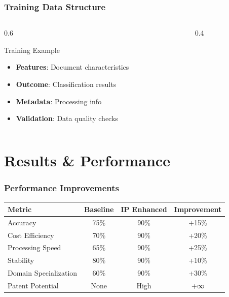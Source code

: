 \documentclass{beamer}
\begin{document}
\begin{frame}
\frametitle{Training Data Structure}
\begin{columns}
\begin{column}{0.6\textwidth}
\begin{block}{Training Example}
\begin{itemize}
\item \textbf{Features}: Document characteristics
\item \textbf{Outcome}: Classification results
\item \textbf{Metadata}: Processing info
\item \textbf{Validation}: Data quality checks
\end{itemize}
\end{block}
\end{column}
\begin{column}{0.4\textwidth}
\begin{center}
\end{center}
\end{column}
\end{columns}
\end{frame}

\section{Results \& Performance}

\begin{frame}
\frametitle{Performance Improvements}
\begin{table}[h]
\centering
\begin{tabular}{@{}lccc@{}}
\toprule
\textbf{Metric} & \textbf{Baseline} & \textbf{IP Enhanced} & \textbf{Improvement} \\
\midrule
Accuracy & 75\% & 90\% & +15\% \\
Cost Efficiency & 70\% & 90\% & +20\% \\
Processing Speed & 65\% & 90\% & +25\% \\
Stability & 80\% & 90\% & +10\% \\
Domain Specialization & 60\% & 90\% & +30\% \\
Patent Potential & None & High & +∞ \\
\bottomrule
\end{tabular}
\end{table}
\end{frame}
\end{document}
